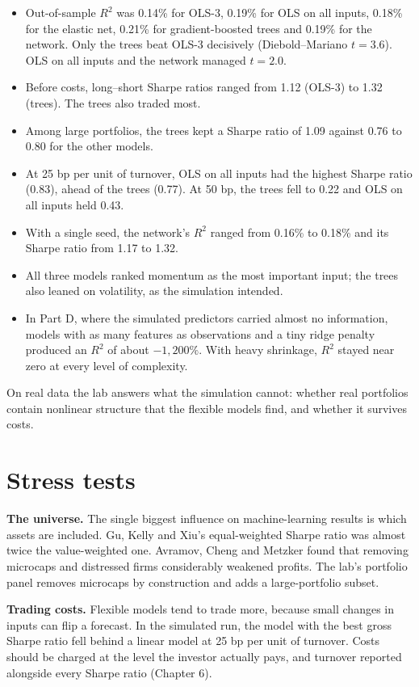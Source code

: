 \begin{itemize}
  \item Out-of-sample $R^2$ was 0.14\% for OLS-3, 0.19\% for OLS on all inputs, 0.18\% for the elastic net, 0.21\% for gradient-boosted trees and 0.19\% for the network. Only the trees beat OLS-3 decisively (Diebold--Mariano $t = 3.6$). OLS on all inputs and the network managed $t = 2.0$.
  \item Before costs, long--short Sharpe ratios ranged from 1.12 (OLS-3) to 1.32 (trees). The trees also traded most.
  \item Among large portfolios, the trees kept a Sharpe ratio of 1.09 against 0.76 to 0.80 for the other models.
  \item At 25 bp per unit of turnover, OLS on all inputs had the highest Sharpe ratio (0.83), ahead of the trees (0.77). At 50 bp, the trees fell to 0.22 and OLS on all inputs held 0.43.
  \item With a single seed, the network's $R^2$ ranged from 0.16\% to 0.18\% and its Sharpe ratio from 1.17 to 1.32.
  \item All three models ranked momentum as the most important input; the trees also leaned on volatility, as the simulation intended.
  \item In Part D, where the simulated predictors carried almost no information, models with as many features as observations and a tiny ridge penalty produced an $R^2$ of about $-1{,}200\%$. With heavy shrinkage, $R^2$ stayed near zero at every level of complexity.
\end{itemize}

On real data the lab answers what the simulation cannot: whether real portfolios contain nonlinear structure that the flexible models find, and whether it survives costs.

\section{Stress tests}
\label{sec:21-stress}

\textbf{The universe.} The single biggest influence on machine-learning results is which assets are included. Gu, Kelly and Xiu's equal-weighted Sharpe ratio was almost twice the value-weighted one. Avramov, Cheng and Metzker found that removing microcaps and distressed firms considerably weakened profits. The lab's portfolio panel removes microcaps by construction and adds a large-portfolio subset.

\textbf{Trading costs.} Flexible models tend to trade more, because small changes in inputs can flip a forecast. In the simulated run, the model with the best gross Sharpe ratio fell behind a linear model at 25 bp per unit of turnover. Costs should be charged at the level the investor actually pays, and turnover reported alongside every Sharpe ratio (Chapter 6).


